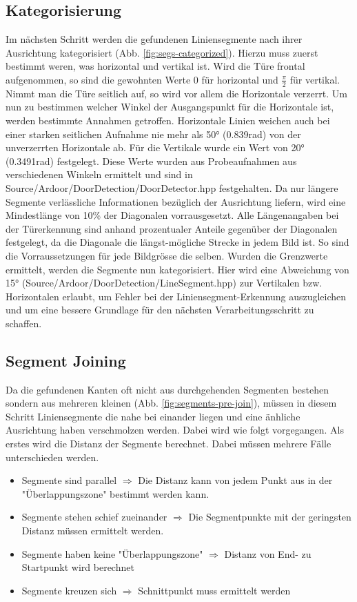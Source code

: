 \subsection{Kategorisierung}
Im nächsten Schritt werden die gefundenen Liniensegmente nach ihrer Ausrichtung kategorisiert (Abb. \ref{fig:segs-categorized}). Hierzu muss zuerst bestimmt weren, was horizontal und vertikal ist. Wird die Türe frontal aufgenommen, so sind  die gewohnten Werte $0$ für horizontal und $\frac{\pi}{2}$ für vertikal. Nimmt man die Türe seitlich auf, so wird vor allem die Horizontale verzerrt. Um nun zu bestimmen welcher Winkel der Ausgangspunkt für die Horizontale ist, werden bestimmte Annahmen getroffen. Horizontale Linien weichen auch bei einer starken seitlichen Aufnahme nie mehr als 50° (0.839rad) von der unverzerrten Horizontale ab. Für die Vertikale wurde ein Wert von 20° (0.3491rad) festgelegt. Diese Werte wurden aus Probeaufnahmen aus verschiedenen Winkeln ermittelt und sind in Source/Ardoor/DoorDetection/DoorDetector.hpp festgehalten. Da nur längere Segmente verlässliche Informationen bezüglich der Ausrichtung liefern, wird eine Mindestlänge von 10\% der Diagonalen vorrausgesetzt. Alle Längenangaben bei der Türerkennung sind anhand prozentualer Anteile gegenüber der Diagonalen festgelegt, da die Diagonale die längst-mögliche Strecke in jedem Bild ist. So sind die Vorraussetzungen für jede Bildgrösse die selben. Wurden die Grenzwerte ermittelt, werden die Segmente nun kategorisiert. Hier wird eine Abweichung von 15° (Source/Ardoor/DoorDetection/LineSegment.hpp) zur Vertikalen bzw. Horizontalen erlaubt, um Fehler bei der Liniensegment-Erkennung auszugleichen und um eine bessere Grundlage für den nächsten Verarbeitungsschritt zu schaffen.

\subsection{Segment Joining}
Da die gefundenen Kanten oft nicht aus durchgehenden Segmenten bestehen sondern aus mehreren kleinen (Abb. \ref{fig:segments-pre-join}), müssen in diesem Schritt Liniensegmente die nahe bei einander liegen und eine änhliche Ausrichtung haben verschmolzen werden. Dabei wird wie folgt vorgegangen. Als erstes wird die Distanz der Segmente berechnet. Dabei müssen mehrere Fälle unterschieden werden.

\begin{itemize}
	\item Segmente sind parallel $\Rightarrow$ Die Distanz kann von jedem Punkt aus in der "Überlappungszone" bestimmt werden kann.
	\item Segmente stehen schief zueinander $\Rightarrow$ Die Segmentpunkte mit der geringsten Distanz müssen ermittelt werden.
	\item Segmente haben keine "Überlappungszone" $\Rightarrow$ Distanz von End- zu Startpunkt wird berechnet
	\item Segmente kreuzen sich $\Rightarrow$ Schnittpunkt muss ermittelt werden
\end{itemize}


